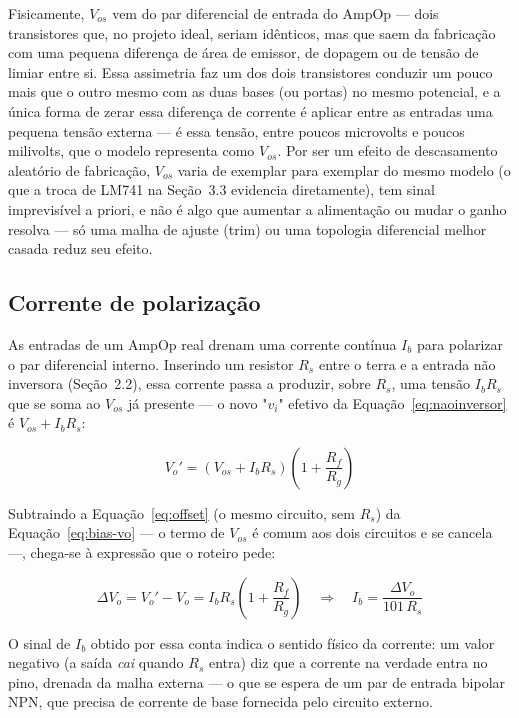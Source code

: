 \documentclass[11pt,a4paper]{article}
\begin{document}
Fisicamente, \(V_{os}\) vem do par diferencial de entrada do AmpOp — dois transistores que, no
projeto ideal, seriam idênticos, mas que saem da fabricação com uma pequena diferença de área de
emissor, de dopagem ou de tensão de limiar entre si. Essa assimetria faz um dos dois transistores
conduzir um pouco mais que o outro mesmo com as duas bases (ou portas) no mesmo potencial, e a
única forma de zerar essa diferença de corrente é aplicar entre as entradas uma pequena tensão
externa — é essa tensão, entre poucos microvolts e poucos milivolts, que o modelo representa como
\(V_{os}\). Por ser um efeito de descasamento aleatório de fabricação, \(V_{os}\) varia de
exemplar para exemplar do mesmo modelo (o que a troca de LM741 na Seção~3.3 evidencia
diretamente), tem sinal imprevisível a priori, e não é algo que aumentar a alimentação ou mudar o
ganho resolva — só uma malha de ajuste (trim) ou uma topologia diferencial melhor casada reduz
seu efeito.

\subsection{Corrente de polarização}

As entradas de um AmpOp real drenam uma corrente contínua \(I_b\) para polarizar o par
diferencial interno. Inserindo um resistor \(R_s\) entre o terra e a entrada não inversora
(Seção~2.2), essa corrente passa a produzir, sobre \(R_s\), uma tensão \(I_b R_s\) que se soma ao
\(V_{os}\) já presente — o novo "\(v_i\)" efetivo da Equação~\eqref{eq:naoinversor} é
\(V_{os}+I_bR_s\):

\begin{equation}
V_o' = \left(V_{os}+I_bR_s\right)\left(1+\frac{R_f}{R_g}\right)
\label{eq:bias-vo}
\end{equation}

Subtraindo a Equação~\eqref{eq:offset} (o mesmo circuito, sem \(R_s\)) da Equação~\eqref{eq:bias-vo}
— o termo de \(V_{os}\) é comum aos dois circuitos e se cancela —, chega-se à expressão que o
roteiro pede:

\begin{equation}
\Delta V_o = V_o' - V_o = I_b R_s\left(1+\frac{R_f}{R_g}\right)
\quad\Rightarrow\quad
I_b = \frac{\Delta V_o}{101\, R_s}
\label{eq:bias}
\end{equation}

O sinal de \(I_b\) obtido por essa conta indica o sentido físico da corrente: um valor negativo
(a saída \emph{cai} quando \(R_s\) entra) diz que a corrente na verdade entra no pino, drenada da
malha externa — o que se espera de um par de entrada bipolar NPN, que precisa de corrente de
base fornecida pelo circuito externo.
\end{document}
